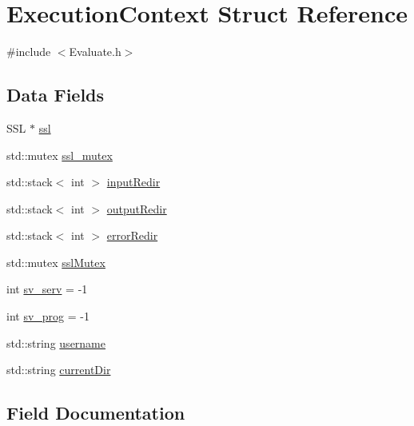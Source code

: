 \hypertarget{structExecutionContext}{}\section{Execution\+Context Struct Reference}
\label{structExecutionContext}


{\ttfamily \#include $<$Evaluate.\+h$>$}

\subsection*{Data Fields}
\begin{DoxyCompactItemize}
\item 
S\+SL $\ast$ \hyperlink{structExecutionContext_a4e07d3987bc1e56f59a36e6363520406}{ssl}
\item 
std\+::mutex \hyperlink{structExecutionContext_a241cad372197f9880a9af9e93ecd7633}{ssl\+\_\+mutex}
\item 
std\+::stack$<$ int $>$ \hyperlink{structExecutionContext_a33562118feda5571fe0ba87186670679}{input\+Redir}
\item 
std\+::stack$<$ int $>$ \hyperlink{structExecutionContext_a15af12d7e8146ae1a5f091b7d9919c8c}{output\+Redir}
\item 
std\+::stack$<$ int $>$ \hyperlink{structExecutionContext_aa5d29389a31755f8a0c1099f7c7768bf}{error\+Redir}
\item 
std\+::mutex \hyperlink{structExecutionContext_aa4fa05fb3cc6f4f19d5b5019b3514ec5}{ssl\+Mutex}
\item 
int \hyperlink{structExecutionContext_aac8fa1ea0b889137efab488cb650cca1}{sv\+\_\+serv} = -\/1
\item 
int \hyperlink{structExecutionContext_a14419dd2173223d2e30444ec9d484d92}{sv\+\_\+prog} = -\/1
\item 
std\+::string \hyperlink{structExecutionContext_a6c1bbd4dcfc82e4902c4382af69ab6d9}{username}
\item 
std\+::string \hyperlink{structExecutionContext_ad3a0ccfbff4fe1b7b0f5ced3a58dca32}{current\+Dir}
\end{DoxyCompactItemize}


\subsection{Field Documentation}
